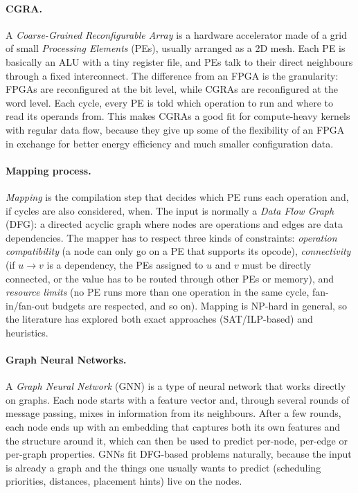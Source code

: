 \documentclass[10pt]{article}
\begin{document}
\paragraph{CGRA.}
A \textit{Coarse-Grained Reconfigurable Array} is a hardware accelerator made of a grid of small \textit{Processing Elements} (PEs), usually arranged as a 2D mesh. Each PE is basically an ALU with a tiny register file, and PEs talk to their direct neighbours through a fixed interconnect. The difference from an FPGA is the granularity: FPGAs are reconfigured at the bit level, while CGRAs are reconfigured at the word level. Each cycle, every PE is told which operation to run and where to read its operands from. This makes CGRAs a good fit for compute-heavy kernels with regular data flow, because they give up some of the flexibility of an FPGA in exchange for better energy efficiency and much smaller configuration data.

\paragraph{Mapping process.}
\textit{Mapping} is the compilation step that decides which PE runs each operation and, if cycles are also considered, when. The input is normally a \textit{Data Flow Graph} (DFG): a directed acyclic graph where nodes are operations and edges are data dependencies. The mapper has to respect three kinds of constraints: \emph{operation compatibility} (a node can only go on a PE that supports its opcode), \emph{connectivity} (if $u \to v$ is a dependency, the PEs assigned to $u$ and $v$ must be directly connected, or the value has to be routed through other PEs or memory), and \emph{resource limits} (no PE runs more than one operation in the same cycle, fan-in/fan-out budgets are respected, and so on). Mapping is NP-hard in general, so the literature has explored both exact approaches (SAT/ILP-based) and heuristics.

\paragraph{Graph Neural Networks.}
A \textit{Graph Neural Network} (GNN) is a type of neural network that works directly on graphs. Each node starts with a feature vector and, through several rounds of message passing, mixes in information from its neighbours. After a few rounds, each node ends up with an embedding that captures both its own features and the structure around it, which can then be used to predict per-node, per-edge or per-graph properties. GNNs fit DFG-based problems naturally, because the input is already a graph and the things one usually wants to predict (scheduling priorities, distances, placement hints) live on the nodes.
\end{document}
